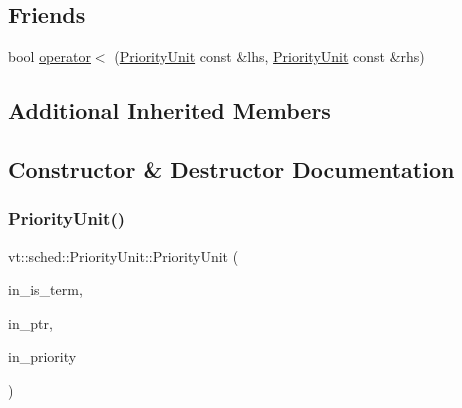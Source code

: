 \subsection*{Friends}
\begin{DoxyCompactItemize}
\item 
bool \hyperlink{structvt_1_1sched_1_1_priority_unit_acb3ebd4c059caed604579a0bbfb8b0e8}{operator$<$} (\hyperlink{structvt_1_1sched_1_1_priority_unit}{Priority\+Unit} const \&lhs, \hyperlink{structvt_1_1sched_1_1_priority_unit}{Priority\+Unit} const \&rhs)
\end{DoxyCompactItemize}
\subsection*{Additional Inherited Members}


\subsection{Constructor \& Destructor Documentation}
\mbox{\label{structvt_1_1sched_1_1_priority_unit_ae8a2706424c4e84db8be30fe59c21718}} 
\subsubsection{\texorpdfstring{Priority\+Unit()}{PriorityUnit()}\hspace{0.1cm}{\footnotesize\ttfamily [1/2]}}
{\footnotesize\ttfamily vt\+::sched\+::\+Priority\+Unit\+::\+Priority\+Unit (\begin{DoxyParamCaption}\item[{bool}]{in\+\_\+is\+\_\+term,  }\item[{\hyperlink{structvt_1_1sched_1_1_base_unit_a9be5d5adaeb011c8ef82f751485ebf9a}{Runnable\+Ptr\+Type}}]{in\+\_\+ptr,  }\item[{\hyperlink{namespacevt_a86bff9f556eb761b27fc8600d006ac04}{Priority\+Type}}]{in\+\_\+priority }\end{DoxyParamCaption})\hspace{0.3cm}{\ttfamily [inline]}}

\mbox{\label{structvt_1_1sched_1_1_priority_unit_aeea5316b975f9c1bde33a5cc3dfb1631}} 
